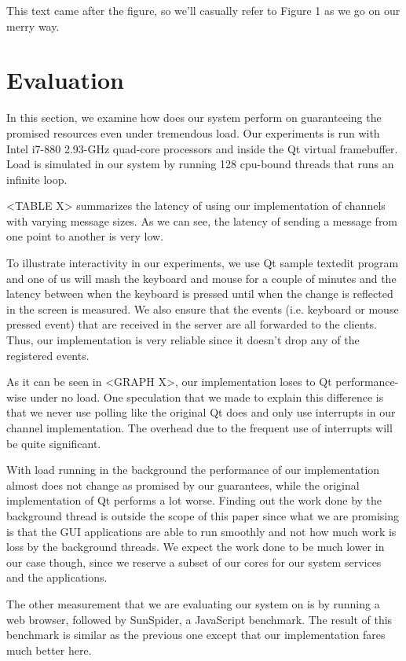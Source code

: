 \documentclass[letterpaper,twocolumn,10pt]{article}
\begin{document}
This text came after the figure, so we'll casually refer to Figure 1
as we go on our merry way.

\section{Evaluation}

In this section, we examine how does our system perform on guaranteeing the promised resources even under tremendous load. Our experiments is run with Intel i7-880 2.93-GHz quad-core processors and inside the Qt virtual framebuffer. Load is simulated in our system by running 128 cpu-bound threads that runs an infinite loop.

<TABLE X> summarizes the latency of using our implementation of channels with varying message sizes. As we can see, the latency of sending a message from one point to another is very low.

To illustrate interactivity in our experiments, we use Qt sample textedit program and one of us will mash the keyboard and mouse for a couple of minutes and the latency between when the keyboard is pressed until when the change is reflected in the screen is measured. We also ensure that the events (i.e. keyboard or mouse pressed event) that are received in the server are all forwarded to the clients. Thus, our implementation is very reliable since it doesn't drop any of the registered events. 

As it can be seen in <GRAPH X>, our implementation loses to Qt performance-wise under no load. One speculation that we made to explain this difference is that we never use polling like the original Qt does and only use interrupts in our channel implementation. The overhead due to the frequent use of interrupts will be quite significant. 

With load running in the background the performance of our implementation almost does not change as promised by our guarantees, while the original implementation of Qt performs a lot worse. Finding out the work done by the background thread is outside the scope of this paper since what we are promising is that the GUI applications are able to run smoothly and not how much work is loss by the background threads. We expect the work done to be much lower in our case though, since we reserve a subset of our cores for our system services and the applications. 

The other measurement that we are evaluating our system on is by running a web browser, followed by SunSpider, a JavaScript benchmark. The result of this benchmark is similar as the previous one except that our implementation fares much better here.
\end{document}

